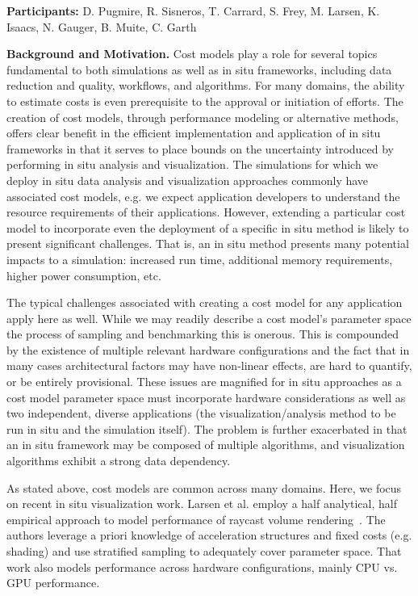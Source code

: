 \license

\textbf{\sffamily Participants:} D. Pugmire, R. Sisneros, T. Carrard, S. Frey, M. Larsen, K. Isaacs, N. Gauger, B. Muite, C. Garth

\medskip\noindent
\textbf{\sffamily Background and Motivation.}
Cost models play a role for several topics fundamental to both simulations as well as in situ frameworks, including data reduction and quality, workflows, and algorithms.  
For many domains, the ability to estimate costs is even prerequisite to the approval or initiation of efforts. 
The creation of cost models, through performance modeling or alternative methods, offers clear benefit in the efficient implementation and application of in situ frameworks in that it serves to place bounds on the uncertainty introduced by performing in situ analysis and visualization. 
The simulations for which we deploy in situ data analysis and visualization approaches commonly have associated cost models, e.g. we expect application developers to understand the resource requirements of their applications.  
However, extending a particular cost model to incorporate even the deployment of a specific in situ method is likely to present significant challenges.  That is, an in situ method presents many potential impacts to a simulation: increased run time, additional memory requirements, higher power consumption, etc.

The typical challenges associated with creating a cost model for any application apply here as well. 
While we may readily describe a cost model’s parameter space the process of sampling and benchmarking this is onerous.  
This is compounded by the existence of multiple relevant hardware configurations and the fact that in many cases architectural factors may have non-linear effects, are hard to quantify, or be entirely provisional.  
These issues are magnified for in situ approaches as a cost model parameter space must incorporate hardware considerations as well as two independent, diverse applications (the visualization/analysis method to be run in situ and the simulation itself).  
The problem is further exacerbated in that an in situ framework may be composed of multiple algorithms, and visualization algorithms exhibit a strong data dependency.

As stated above, cost models are common across many domains.   
Here, we focus on recent in situ visualization work.  
Larsen et al. employ a half analytical, half empirical approach to model performance of raycast volume rendering~\cite{LHKPMH13}. 
The authors leverage a priori knowledge of acceleration structures and fixed costs (e.g. shading) and use stratified sampling to adequately cover parameter space.  
That work also models performance across hardware configurations, mainly CPU vs. GPU performance.  

